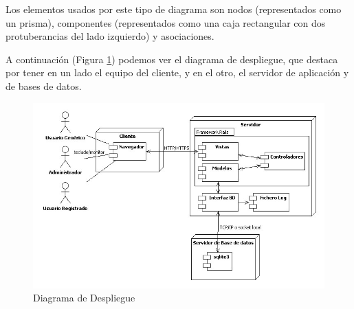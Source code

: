 \documentclass[a4paper,oneside,11pt]{book}
\begin{document}
		Los elementos usados por este tipo de diagrama son nodos (representados como un prisma), componentes (representados como una caja rectangular con dos protuberancias del lado izquierdo) y asociaciones.
	
		A continuación (Figura \ref{fig:despliegue}) podemos ver el diagrama de despliegue, que destaca por tener en un lado el equipo del cliente, y en el otro, el servidor de aplicación y de bases de datos.
		
			\begin{figure}[H]
			  \centering
			    \includegraphics[width=16cm]{img/jpg/despliegue/despliegue.jpg}
			  \caption{Diagrama de Despliegue}
			  \label{fig:despliegue}
			\end{figure}
		
	
\end{document}
